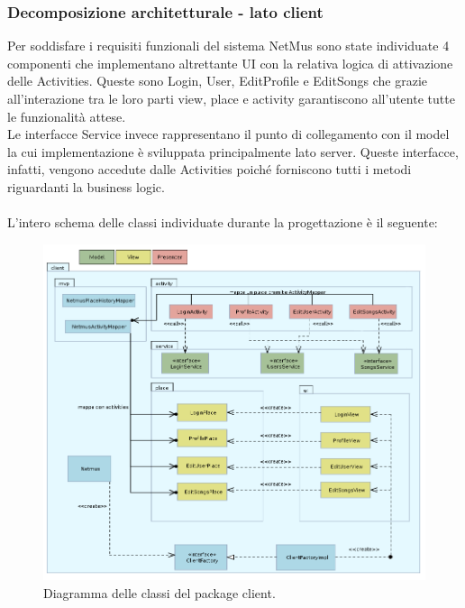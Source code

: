 \newpage
\subsubsection{Decomposizione architetturale - lato client}
Per soddisfare i requisiti funzionali del sistema NetMus sono state individuate
4 componenti che implementano altrettante UI con la relativa logica di
attivazione delle Activities. Queste sono Login, User, EditProfile e EditSongs
che grazie all'interazione tra le loro parti view, place e activity garantiscono
all'utente tutte le funzionalit\`a attese.\\
Le interfacce Service invece rappresentano il punto di collegamento con il model
la cui implementazione \`e sviluppata principalmente lato server. Queste
interfacce, infatti, vengono accedute dalle Activities poich\'e forniscono tutti i
metodi riguardanti la business logic. \\\\ 
L'intero schema delle classi individuate durante la progettazione \`e il
seguente: 
\begin{figure}[h]
  \centering
  \includegraphics[width=16.5cm]{img/ST/client.png}
\caption{Diagramma delle classi del package client.}
\end{figure}
\newpage
